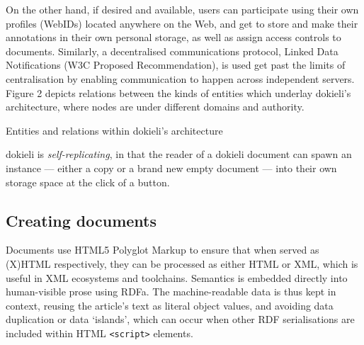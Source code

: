 \documentclass[a4paper]{llncs}
\begin{document}
                                    
\par On the other hand, if desired and available, users can participate using their own profiles (WebIDs) located anywhere on the Web, and get to store and make their annotations in their own personal storage, as well as assign access controls to documents. Similarly, a decentralised communications protocol, \empty Linked Data Notifications (\empty W3C Proposed Recommendation), is used get past the limits of centralisation by enabling communication to happen across independent servers. Figure 2 depicts relations between the kinds of entities which underlay dokieli’s architecture, where nodes are under different domains and authority.

                                    
                                        
                                        Entities and relations within dokieli’s architecture
                                    

                                    
\par dokieli is {\em self-replicating}, in that the reader of a dokieli document can spawn an instance — either a copy or a brand new empty document — into their own storage space at the click of a button.
                                
                            

                            
                                \subsection{Creating documents}
  \label{creating-documents}

                                
                                    
\par Documents use HTML5 \empty Polyglot Markup to ensure that when served as (X)HTML respectively, they can be processed as either HTML or XML, which is useful in XML ecosystems and toolchains. 
                                    Semantics is embedded directly into human-visible prose using RDFa. The machine-readable data is thus kept in context, reusing the article’s text as literal object values, and avoiding data duplication or data ‘islands’, which can occur when other RDF serialisations are included within HTML {\tt <script>} elements.
                                    
\end{document}

